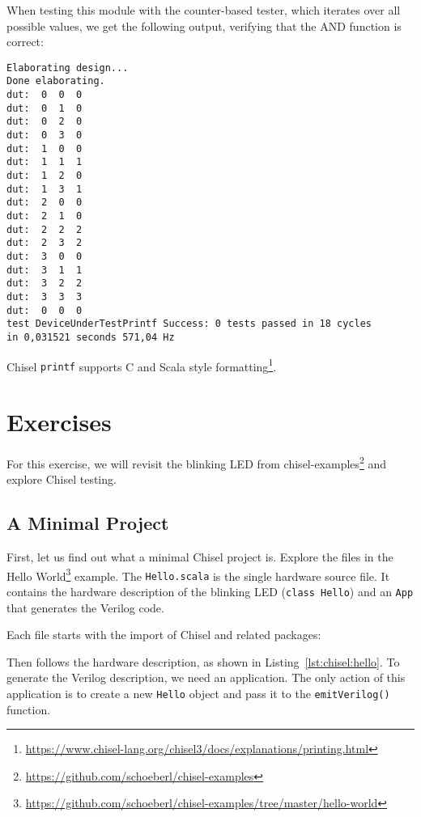 \documentclass[%
    10pt,
    headinclude, footexclude,
    openright, %
    notitlepage,
    cleardoubleempty,
    headsepline,
    pointlessnumbers,
    bibtotoc, idxtotoc,
    ]{scrbook}
\newcommand{\code}[1]{{\lstinline[basicstyle=\small\ttfamily]{#1}}}
\newcommand{\myref}[2]{\href{#1}{#2}}
\renewcommand{\myref}[2]{{#2}{\footnote{\url{#1}}}}
\begin{document}

\noindent When testing this module with the counter-based tester, which iterates over all possible
values, we get the following output, verifying that the AND function is correct:

\begin{verbatim}
Elaborating design...
Done elaborating.
dut:  0  0  0
dut:  0  1  0
dut:  0  2  0
dut:  0  3  0
dut:  1  0  0
dut:  1  1  1
dut:  1  2  0
dut:  1  3  1
dut:  2  0  0
dut:  2  1  0
dut:  2  2  2
dut:  2  3  2
dut:  3  0  0
dut:  3  1  1
dut:  3  2  2
dut:  3  3  3
dut:  0  0  0
test DeviceUnderTestPrintf Success: 0 tests passed in 18 cycles
in 0,031521 seconds 571,04 Hz
\end{verbatim}

Chisel \code{printf} supports
\myref{https://www.chisel-lang.org/chisel3/docs/explanations/printing.html}{C and Scala style formatting}.


\section{Exercises}

For this exercise, we will revisit the blinking LED from
\myref{https://github.com/schoeberl/chisel-examples}{chisel-examples}
and explore Chisel testing.

\subsection{A Minimal Project}

First, let us find out what a minimal Chisel project is. Explore the files in the
\myref{https://github.com/schoeberl/chisel-examples/tree/master/hello-world}{Hello World}
example.
The \code{Hello.scala} is the single hardware source file.
It contains the hardware description of the blinking LED (\code{class Hello})
and an \code{App} that generates the Verilog code.

Each file starts with the import of Chisel and related packages:


\noindent Then follows the hardware description, as shown in Listing~\ref{lst:chisel:hello}.
To generate the Verilog description, we need an application.
The only action of this application is to create a new \code{Hello} object and pass it
to the \code{emitVerilog()} function.

\end{document}
